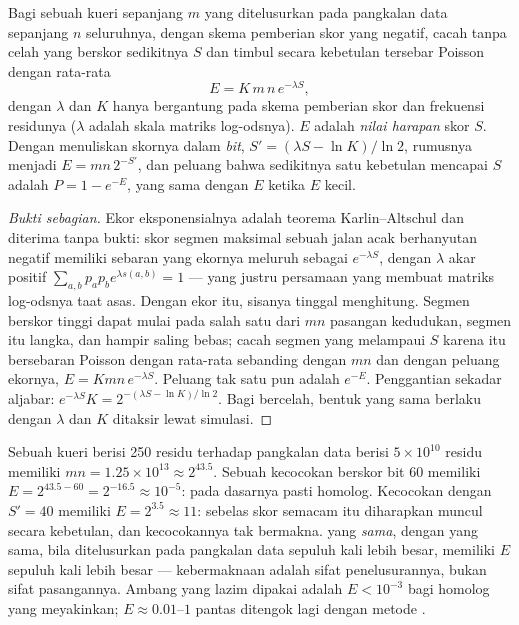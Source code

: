 \begin{theorem}\label{thm:b3:bioinformatics:evalue}
Bagi sebuah kueri sepanjang $m$ yang ditelusurkan pada pangkalan data
sepanjang $n$ seluruhnya, dengan skema pemberian skor yang 
negatif, cacah  tanpa celah yang berskor sedikitnya $S$ dan
timbul secara kebetulan tersebar Poisson dengan rata-rata
\[
E = K\,m\,n\,e^{-\lambda S},
\]
dengan $\lambda$ dan $K$ hanya bergantung pada skema pemberian skor dan
frekuensi residunya ($\lambda$ adalah skala matriks log-odsnya).
$E$ adalah \emph{nilai harapan} skor $S$. Dengan menuliskan skornya dalam
\emph{bit}, $S' = (\lambda S - \ln K)/\ln 2$, rumusnya menjadi
$E = m n\, 2^{-S'}$, dan peluang bahwa sedikitnya satu 
kebetulan mencapai $S$ adalah $P = 1 - e^{-E}$, yang sama dengan $E$ ketika
$E$ kecil.
\end{theorem}
\begin{proof}[Bukti sebagian]
Ekor eksponensialnya adalah teorema Karlin--Altschul dan diterima tanpa bukti:
skor segmen maksimal sebuah jalan acak berhanyutan negatif memiliki
sebaran yang ekornya meluruh sebagai $e^{-\lambda S}$, dengan $\lambda$ akar
positif $\sum_{a,b} p_{a} p_{b} e^{\lambda s(a,b)} = 1$ ---
yang justru persamaan yang membuat matriks log-odsnya taat asas.
Dengan ekor itu, sisanya tinggal menghitung. Segmen berskor tinggi dapat mulai
pada salah satu dari $mn$ pasangan kedudukan, segmen itu langka, dan hampir
saling bebas; cacah segmen yang melampaui $S$ karena itu bersebaran Poisson
dengan rata-rata sebanding dengan $mn$ dan dengan peluang ekornya,
$E = Kmn\,e^{-\lambda S}$. Peluang tak satu pun adalah $e^{-E}$. Penggantian
 sekadar aljabar: $e^{-\lambda S} K = 2^{-(\lambda S -
\ln K)/\ln 2}$. Bagi  bercelah, bentuk yang sama berlaku dengan
$\lambda$ dan $K$ ditaksir lewat simulasi.
\end{proof}

\begin{example}\label{ex:b3:bioinformatics:evalue}
Sebuah kueri berisi \num{250} residu terhadap pangkalan data berisi
$5\times 10^{10}$ residu memiliki $mn = 1.25\times 10^{13} \approx 2^{43.5}$.
Sebuah kecocokan berskor bit $60$ memiliki $E = 2^{43.5 - 60} = 2^{-16.5} \approx 10^{-5}$:
pada dasarnya pasti homolog. Kecocokan dengan $S' = 40$ memiliki $E = 2^{3.5}
\approx 11$: sebelas skor semacam itu diharapkan muncul secara kebetulan, dan
kecocokannya tak bermakna.  yang \emph{sama}, dengan  yang
sama, bila ditelusurkan pada pangkalan data sepuluh kali lebih besar,
memiliki $E$ sepuluh kali lebih besar --- kebermaknaan adalah sifat
penelusurannya, bukan sifat pasangannya. Ambang yang lazim dipakai adalah
$E < 10^{-3}$ bagi homolog yang meyakinkan; $E \approx 0.01$--$1$ pantas
ditengok lagi dengan metode .
\end{example}

